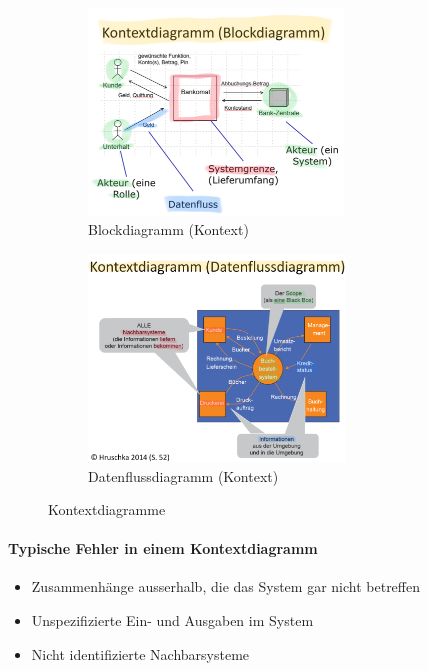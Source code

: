 \documentclass[a4paper]{article}
\begin{document}
		\begin{figure}[!htb]
			\centering
			\begin{subfigure}{.45\textwidth}
				\centering
				\includegraphics[height=5.5cm]{img/re/01/kontext_block.jpeg}
				\caption{Blockdiagramm (Kontext)}
				\label{fig:re_kontext_block}
			\end{subfigure}
			\begin{subfigure}{.45\textwidth}
				\centering
				\includegraphics[height=5.5cm]{img/re/01/kontext_datenfluss.jpeg}
				\caption{Datenflussdiagramm (Kontext)}
				\label{fig:re_kontext_datenfluss}
			\end{subfigure}
			\caption{Kontextdiagramme}
			\label{fig:re_kontext_dias}
		\end{figure}
	
			\paragraph{Typische Fehler in einem Kontextdiagramm}
			
			\begin{itemize}
				\item Zusammenhänge ausserhalb, die das System gar nicht betreffen
				\item Unspezifizierte Ein- und Ausgaben im System
				\item Nicht identifizierte Nachbarsysteme
			\end{itemize}
		
\end{document}

